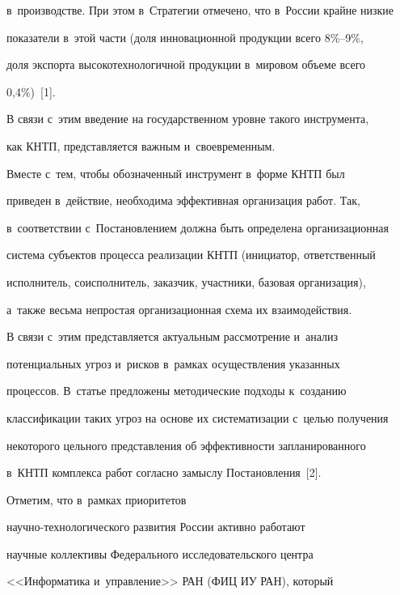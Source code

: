 в~производстве. При этом в~Стратегии отмечено, что в~России крайне низкие 

показатели в~этой части (доля инновационной продукции всего 8\%--9\%, 

доля экспорта высокотехнологичной продукции в~мировом объеме всего 

0,4\%)~[1]. 

{



}

    

    В связи с~этим введение на государственном уровне такого инструмента, 

как КНТП, представляется важным и~своевременным. 

    

    Вместе с~тем, чтобы обозначенный инструмент в~форме КНТП был 

приведен в~действие, необходима эффективная организация работ. Так, 

в~соответствии с~Постановлением должна быть определена организационная 

система субъектов процесса реализации КНТП (инициатор, ответственный 

исполнитель, соисполнитель, заказчик, участники, базовая организация), 

а~также весьма непростая организационная схема их взаимодействия. 

    

    В связи с~этим представляется актуальным рассмотрение и~анализ 

потенциальных угроз и~рисков в~рамках осуществления указанных 

процессов. В~статье предложены методические подходы к~созданию 

классификации таких угроз на основе их систематизации с~целью получения 

некоторого цельного представления об эффективности запланированного 

в~КНТП комплекса работ согласно замыслу Постановления~[2]. 

    

    Отметим, что в~рамках приоритетов  

на\-уч\-но-тех\-но\-ло\-ги\-че\-ско\-го развития России активно работают 

научные коллективы Федерального исследовательского центра 

<<Информатика и~управление>> РАН (ФИЦ ИУ РАН), который 

